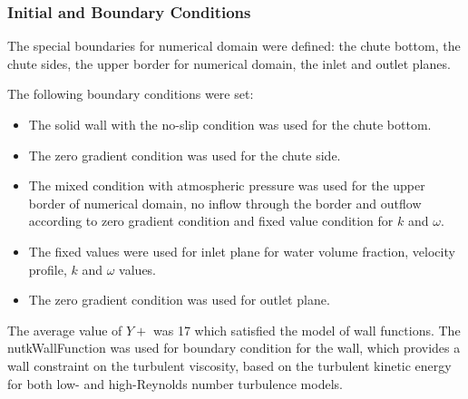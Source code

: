 \documentclass[mathematics,article,submit,pdftex,moreauthors]{Definitions/mdpi}
\begin{document}
\subsubsection{Initial and Boundary Conditions}

The special boundaries for numerical domain were defined: the chute bottom, the chute sides, the upper border for numerical domain, the inlet and outlet planes.

The following boundary conditions were set:

\begin{itemize}
    \item The solid wall with the no-slip condition was used for the chute bottom.
    \item The zero gradient condition was used for the chute side.
    \item The mixed condition with atmospheric pressure was used for the upper border of numerical domain, no inflow through the border and outflow according to zero gradient condition and fixed value condition for $k$ and $\omega$.
    \item The fixed values were used for inlet plane for water volume fraction, velocity profile, $k$ and $\omega$ values.
    \item The zero gradient condition was used for outlet plane.
\end{itemize}

The average value of $Y+$ was 17 which satisfied the model of wall functions. The nutkWallFunction was used for boundary condition for the wall, which provides a wall constraint on the turbulent viscosity, based on the turbulent kinetic energy for both low- and high-Reynolds number turbulence models.
\end{document}
